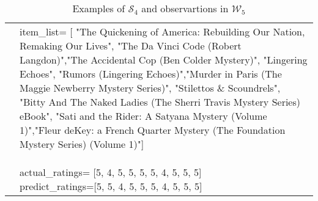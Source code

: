 \begin{table*}[h!]
{\begin{tabular}{ll}
      \multicolumn{1}{l}{} &
      \parbox{0.75\textwidth}{item\_list= [ "The Quickening of America: Rebuilding Our Nation, Remaking Our Lives", "The Da Vinci Code (Robert Langdon)","The Accidental Cop (Ben Colder Mystery)", "Lingering Echoes", "Rumors (Lingering Echoes)","Murder in Paris (The Maggie Newberry Mystery Series)", "Stilettos \& Scoundrels", "Bitty And The Naked Ladies (The Sherri Travis Mystery Series) eBook", "Sati and the Rider: A Satyana Mystery (Volume 1)","Fleur deKey: a French Quarter Mystery (The Foundation Mystery Series) (Volume 1)"]\\\\
      actual\_ratings= [5, 4, 5, 5, 5, 5, 4, 5, 5, 5]\\
      predict\_ratings=[5, 5, 4, 5, 5, 5, 4, 5, 5, 5]
      } \\ \bottomrule
     
      \end{tabular}
      }
      \caption{Examples of $\mathcal{S}_4$ and observartions in $\mathcal{W}_5$}
      \label{tab:persona_evolve_5}
      \end{table*}
  